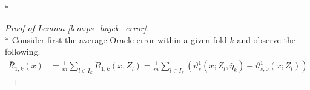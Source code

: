 \newpage 
\begin{lem}\label{lem:ps_hajek_error}\mbox{}\\*
    
\end{lem}

\begin{proof}[Proof of Lemma \ref{lem:ps_hajek_error}]\mbox{}\\*
    Consider first the average Oracle-error within a given fold $k$ and observe the following.
    \begin{equation}
        \begin{aligned}
            \bar{R}_{1, k}\left(x\right)
            & = \frac{1}{m}\sum_{l \in I_{k}}\tilde{R}_{1, k}\left(x, Z_{l}\right)
            = \frac{1}{m}\sum_{l \in I_{k}}
            \left(\vartheta_{s}^{1}\left(x; Z_l, \hat{\eta}_{k}\right)
            - \vartheta_{s,0}^{1}\left(x; Z_l\right) 
            \right)
        \end{aligned}
    \end{equation}

\end{proof}
